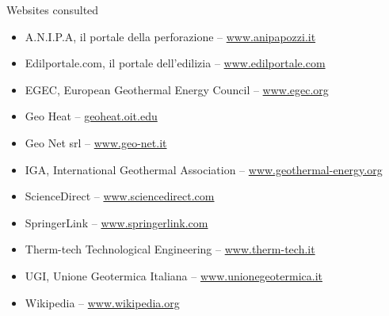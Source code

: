 \cleardoublepage
{}
{}
\nocite{*}


%

\vspace{2.5cm}
\begin{Large}Websites consulted\end{Large}
\begin{itemize}
\item A.N.I.P.A, il portale della perforazione	-- \url{www.anipapozzi.it}
\item Edilportale.com, il portale dell'edilizia -- \url{www.edilportale.com}
\item EGEC, European Geothermal Energy Council -- \url{www.egec.org}
\item Geo Heat -- \url{geoheat.oit.edu}
\item Geo Net srl -- \url{www.geo-net.it}
\item IGA, International Geothermal Association -- \url{www.geothermal-energy.org}
\item ScienceDirect -- \url{www.sciencedirect.com}
\item SpringerLink -- \url{www.springerlink.com}
\item Therm-tech Technological Engineering -- \url{www.therm-tech.it}
\item UGI, Unione Geotermica Italiana -- \url{www.unionegeotermica.it}
\item Wikipedia -- \url{www.wikipedia.org}
\end{itemize}


